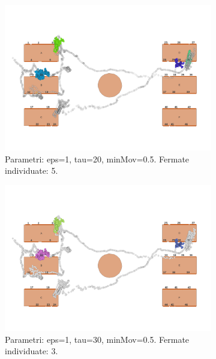 \documentclass[12pt]{article}
\begin{document}
\begin{figure}[htb!]
    \hfill
    \begin{subfigure}[b]{0.45\textwidth}
        \centering
        \includegraphics[width=\textwidth]{images/stop_points_p67_SOC_eps1_tau20_minMov05.png}
        \caption{Parametri: eps=1, tau=20, minMov=0.5. Fermate individuate: 5.}
        \label{stop_points_p67_SOC_eps1_tau20_minMov05}
    \end{subfigure}
    \hfill
    \begin{subfigure}[b]{0.45\textwidth}
        \centering
        \includegraphics[width=\textwidth]{images/stop_points_p67_SOC_eps1_tau30_minMov05.png}
        \caption{Parametri: eps=1, tau=30, minMov=0.5. Fermate individuate: 3.}
        \label{stop_points_p67_SOC_eps1_tau30_minMov05}
    \end{subfigure}
    \hfill
    \begin{subfigure}[b]{0.45\textwidth}

\end{subfigure}
\end{figure}
\end{document}
